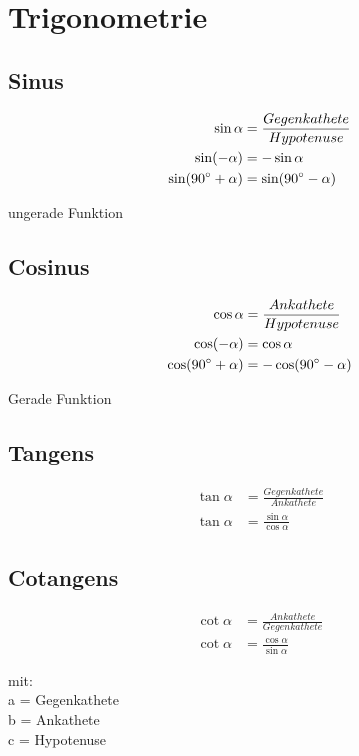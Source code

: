 \section{Trigonometrie}

\begin{sectionbox}
	\subsection{Sinus}
		\begin{emphbox}
			\begin{align*}
			 \sin \alpha &= \frac{Gegenkathete}{Hypotenuse} \\
			 \sin (-\alpha) &= -\sin \alpha \\
			 \sin (90 \degree + \alpha) &= \sin (90 \degree - \alpha)
			\end{align*}
		\end{emphbox}
		ungerade Funktion
	\subsection{Cosinus}
		\begin{emphbox}
			\begin{align*}
			\cos \alpha &= \frac{Ankathete}{Hypotenuse}\\
			\cos (-\alpha) &= \cos \alpha\\
			\cos (90 \degree + \alpha) &= -\cos (90 \degree - \alpha)
			\end{align*}
		\end{emphbox}
		Gerade Funktion

	\subsection{Tangens}
		\begin{emphbox}
			\begin{align*}
			\tan \alpha &= \frac{Gegenkathete}{Ankathete} \\
			\tan \alpha &= \frac{\sin \alpha}{\cos \alpha} 
			\end{align*}
		\end{emphbox}
		
	\subsection{Cotangens}
		\begin{emphbox}
			\begin{align*}
			\cot \alpha &= \frac{Ankathete}{Gegenkathete} \\
			\cot \alpha &= \frac{\cos \alpha}{\sin \alpha} 		
			\end{align*}
		\end{emphbox}
	mit:\\
	a = Gegenkathete\\
	b = Ankathete\\
	c = Hypotenuse


\end{sectionbox}
